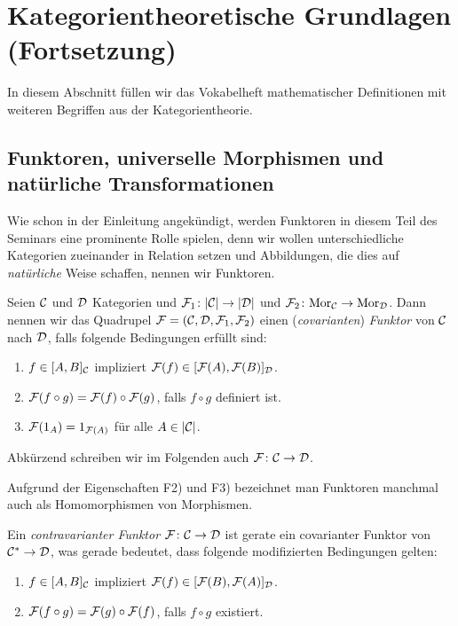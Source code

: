 \section{Kategorientheoretische Grundlagen (Fortsetzung)}

In diesem Abschnitt füllen wir das Vokabelheft mathematischer Definitionen mit weiteren Begriffen aus der Kategorientheorie.

\subsection{Funktoren, universelle Morphismen und natürliche Transformationen}

Wie schon in der Einleitung angekündigt, werden Funktoren in diesem Teil des Seminars eine prominente Rolle spielen, denn wir wollen unterschiedliche Kategorien zueinander in Relation setzen und Abbildungen, die dies auf \emph{natürliche} Weise schaffen, nennen wir Funktoren.

\begin{defn}
  Seien $\mathcal{C}$ und $\mathcal{D}$ Kategorien und $\mathcal{F}_1 \colon |\mathcal{C}| \to |\mathcal{D}|$ und $\mathcal{F}_2 \colon \mathrm{Mor}_{\mathcal{C}}\to \mathrm{Mor}_{\mathcal{D}}$. 
  Dann nennen wir das Quadrupel $\mathcal{F} = (\mathcal{C}, \mathcal{D}, \mathcal{F}_1, \mathcal{F}_2)$ einen (\emph{covarianten}) \emph{Funktor} von $\mathcal{C}$ nach $\mathcal{D}$, falls folgende Bedingungen erfüllt sind:
  \begin{enumerate}[F1)]
    \item $f \in [A, B]_{\mathcal{C}}$ impliziert $\mathcal{F}(f) \in [\mathcal{F}(A), \mathcal{F}(B)]_{\mathcal{D}}$.
    \item $\mathcal{F}(f \circ g) = \mathcal{F}(f) \circ \mathcal{F}(g)$, falls $f \circ g$ definiert ist.
    \item $\mathcal{F}(1_A) = 1_{\mathcal{F}(A)}$ für alle $A \in |\mathcal{C}|$.
  \end{enumerate}
  Abkürzend schreiben wir im Folgenden auch $\mathcal{F} \colon \mathcal{C} \to \mathcal{D}$.
\end{defn}

Aufgrund der Eigenschaften F2) und F3) bezeichnet man Funktoren manchmal auch als Homomorphismen von Morphismen.

Ein \emph{contravarianter Funktor} $\mathcal{F} \colon \mathcal{C} \to \mathcal{D}$ ist gerate ein covarianter Funktor von $\mathcal{C}^* \to \mathcal{D}$, was gerade bedeutet, dass folgende modifizierten Bedingungen gelten:
\begin{enumerate}[F1')]
  \item $f \in [A, B]_{\mathcal{C}}$ impliziert $\mathcal{F}(f) \in [\mathcal{F}(B), \mathcal{F}(A)]_{\mathcal{D}}$.
  \item $\mathcal{F}(f \circ g) = \mathcal{F}(g) \circ \mathcal{F}(f)$, falls $f \circ g$ existiert.
\end{enumerate}

